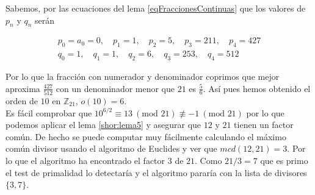 \documentclass[11pt, spanish]{report}
\numberwithin{equation}{section}
\numberwithin{defin}{section}
\begin{document}
\begin{appendices}
Sabemos, por las ecuaciones del lema \ref{eqFraccionesContinuas} que los valores de $p_n$ y $q_n$ serán

\begin{align}
p_0=a_0=0,\quad p_1=1,\quad p_2=5,\quad p_3=211,\quad p_4=427\\
q_0=1,\quad q_1=1,\quad q_2=6,\quad q_3=253,\quad q_4=512
\end{align}

Por lo que la fracción con numerador y denominador coprimos que mejor aproxima $\frac{427}{512}$ con un denominador menor que $21$ es $\frac{5}{6}$. Así pues hemos obtenido el orden de $10$ en $\mathbb{Z}_{21}$, $o(10)=6$.\\

Es fácil comprobar que $10^{6/2}\equiv 13\ (\text{mod }21)\not\equiv -1\ (\text{mod }21)$ por lo que podemos aplicar el lema \ref{shor:lema5} y asegurar que $12$ y $21$ tienen un factor común. De hecho se puede computar muy fácilmente calculando el máximo común divisor usando el algoritmo de Euclides y ver que $mcd(12,21)=3$. Por lo que el algoritmo ha encontrado el factor $3$ de $21$.  Como $21/3=7$ que es primo el test de primalidad lo detectaría y el algoritmo pararía con la lista de divisores $\{3,7\}$.


\end{appendices}


%
%
{\footnotesize

\newpage
\printindex
\newpage
\listoffigures
\renewcommand{\listalgorithmname}{Índice de algoritmos}
\listofalgorithms
{}
\newpage}
\end{document}
